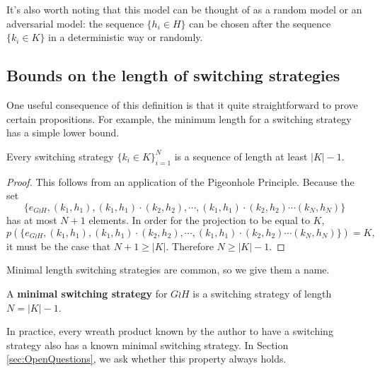 It's also worth noting that this model can be thought of as a random model or an
adversarial model: the sequence $\{h_i \in H\}$ can be chosen after the sequence
$\{k_i \in K\}$ in a deterministic way or randomly.

\subsection{Bounds on the length of switching strategies}

One useful consequence of this definition is that it quite straightforward to
prove certain propositions. For example, the minimum length for a switching strategy
has a simple lower bound.
\begin{proposition}
  Every switching strategy $\{k_i \in K\}_{i=1}^{N}$ is a sequence of
  length at least ${|K| - 1}$.
\end{proposition}
\begin{proof}
  This follows from an application of the Pigeonhole Principle. Because the set \begin{equation}
    \{e_{G \wr H}, (k_1, h_1), (k_1, h_1)\cdot(k_2, h_2), \cdots, (k_1, h_1)\cdot(k_2, h_2)\cdots(k_N, h_N)\}
  \end{equation} has at most $N+1$ elements. In order for the projection to be equal to $K$, \begin{equation}
    p(\{e_{G \wr H}, (k_1, h_1), (k_1, h_1)\cdot(k_2, h_2), \cdots, (k_1, h_1)\cdot(k_2, h_2)\cdots(k_N, h_N)\}) = K,
  \end{equation} it must be the case that $N+1 \geq |K|$. Therefore $N \geq |K| - 1$.
\end{proof}

Minimal length switching strategies are common, so we give them a name.
\begin{definition}
  A \textbf{minimal switching strategy} for $G \wr H$ is a switching strategy
  of length $N = |K| - 1.$
\end{definition}

In practice, every wreath product known by the author to have a switching
strategy also has a known minimal switching strategy.
In Section \ref{sec:OpenQuestions}, we ask whether this property always holds.


